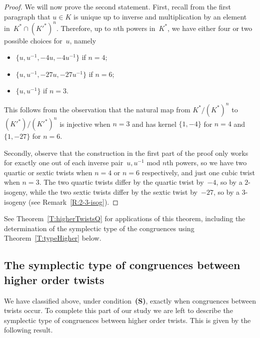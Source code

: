 \documentclass[twoside,leqno,symbols-for-thanks, draft]{rmi}
\numberwithin{equation}{section}
\theoremstyle{remark}
\begin{document}
\begin{proof}
We will now prove the second statement. First, recall from the first paragraph that $u \in K$ is unique up to inverse and
multiplication by an element
in~$K^*\cap(K'^*)^n$. Therefore, up to $n$th powers in~$K^*$,  
we have either four or two
possible choices for~$u$, namely
\begin{itemize}
  \item $\{u, u^{-1}, -4u, -4u^{-1}\}$ if $n=4$;
  \item $\{u, u^{-1}, -27u, -27u^{-1}\}$ if $n=6$;
  \item $\{u, u^{-1}\}$ if $n=3$.
\end{itemize}

This follows from the observation that the natural map from
$K^*/(K^*)^n$ to $(K'^*)/(K'^*)^n$ is injective when $n=3$ and has
kernel $\{1,-4\}$ for $n=4$ and $\{1,-27\}$ for $n=6$.

Secondly, observe that the construction in the first part of the proof
only works for exactly one out of each inverse pair~$u,u^{-1}$ mod
$n$th powers, so we have two quartic or sextic twists when $n=4$ or
$n=6$ respectively, and just one cubic twist when $n=3$.  The two
quartic twists differ by the quartic twist by~$-4$, so by a
$2$-isogeny, while the two sextic twists differ by the sextic twist
by~$-27$, so by a $3$-isogeny (see Remark~\ref{R:2-3-isog}).
\end{proof}

See Theorem~\ref{T:higherTwistsQ} for applications of this theorem,
including the determination of the symplectic type of the congruences
using Theorem~\ref{T:typeHigher} below.


\subsection{The symplectic type of congruences between higher order twists}
\label{SS:typeHigher}
We have classified above, under condition~{\bf (S)}, exactly when congruences between twists occur. To complete this part of our study we are left to describe the symplectic type of congruences between higher order twists. 
This is given by the following result. 
\end{document}
